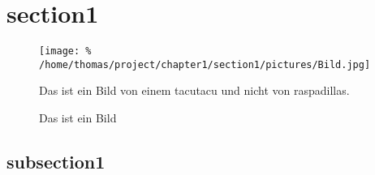 \section{section1}\label{sec:section1}
	\lipsum[2]
	
	\newpage
		
	\begin{figure}[h]
		\centering
		\texttt{[image: \%
			/home/thomas/project/chapter1/section1/pictures/Bild.jpg]}
		\caption[Bild]{Das ist ein Bild von einem \Gls{tacutacu} %
		               und nicht von \Glspl{raspadilla}.}
		\label{pic:Bild}
	\end{figure} %
	
	\begin{figure}[h]
		\centering
		\scalebox{0.8}{}
		\caption[Plot]{Das ist ein Bild}
		\label{pic:Plot}
	\end{figure}
	
	\subsection{subsection1}
		\lipsum[3]
		
